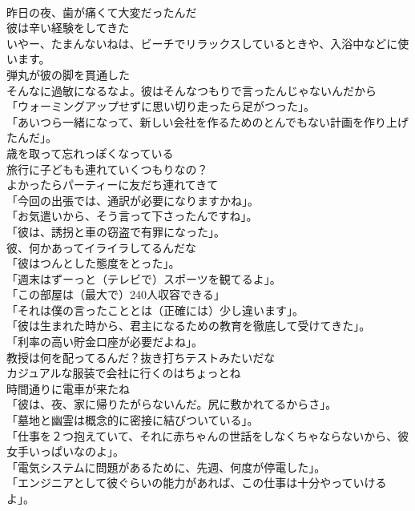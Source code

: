 \documentclass[8pt]{extreport}
\begin{document}
\begin{CJK}{UTF8}{min}
\\	昨日の夜、歯が痛くて大変だったんだ	
\\	彼は辛い経験をしてきた	
\\	いやー、たまんないねは、ビーチでリラックスしているときや、入浴中などに使います。	
\\	弾丸が彼の脚を貫通した	
\\	そんなに過敏になるなよ。彼はそんなつもりで言ったんじゃないんだから	
\\	「ウォーミングアップせずに思い切り走ったら足がつった」。	
\\	「あいつら一緒になって、新しい会社を作るためのとんでもない計画を作り上げたんだ」。	
\\	歳を取って忘れっぽくなっている	
\\	旅行に子どもも連れていくつもりなの？	
\\	よかったらパーティーに友だち連れてきて	
\\	「今回の出張では、通訳が必要になりますかね」。	
\\	「お気遣いから、そう言って下さったんですね」。	
\\	「彼は、誘拐と車の窃盗で有罪になった」。	
\\	彼、何かあってイライラしてるんだな	
\\	「彼はつんとした態度をとった」。	
\\	「週末はずーっと（テレビで）スポーツを観てるよ」。	
\\	「この部屋は（最大で）240人収容できる」	
\\	「それは僕の言ったこととは（正確には）少し違います」。	
\\	「彼は生まれた時から、君主になるための教育を徹底して受けてきた」。	
\\	「利率の高い貯金口座が必要だよね」。	
\\	教授は何を配ってるんだ？抜き打ちテストみたいだな	
\\	カジュアルな服装で会社に行くのはちょっとね	
\\	時間通りに電車が来たね	
\\	「彼は、夜、家に帰りたがらないんだ。尻に敷かれてるからさ」。	
\\	「墓地と幽霊は概念的に密接に結びついている」。	
\\	「仕事を２つ抱えていて、それに赤ちゃんの世話をしなくちゃならないから、彼女手いっぱいなのよ」。	
\\	「電気システムに問題があるために、先週、何度が停電した」。	
\\	「エンジニアとして彼ぐらいの能力があれば、この仕事は十分やっていけるよ」。	

\end{CJK}
\end{document}

